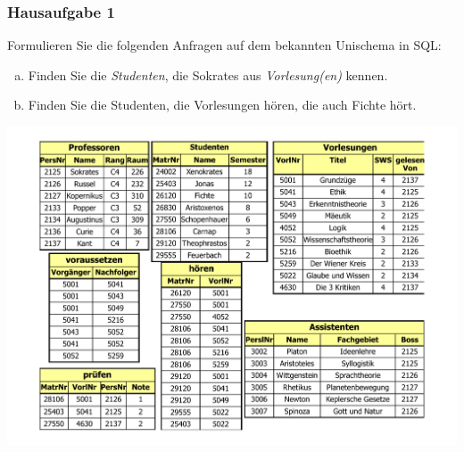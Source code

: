 \begin{frame}
	\frametitle{Hausaufgabe 1}
	\vspace{0.5cm}

	\begin{multicols}{2}
		Formulieren Sie die folgenden Anfragen auf dem bekannten Unischema in SQL:
		\begin{enumerate}[a)]
			\item Finden Sie die \textit{Studenten}, die Sokrates aus \textit{Vorlesung(en)} kennen.
			\item Finden Sie die Studenten, die Vorlesungen hören, die auch Fichte hört.
		\end{enumerate}
		\vfill\columnbreak

		\begin{center}
			\includegraphics[height=.6\paperheight]{../img/uni.pdf}
		\end{center}

	\end{multicols}
\end{frame}

